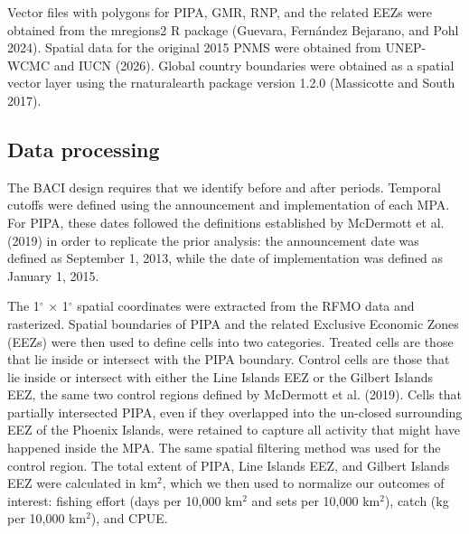 \documentclass[
  letterpaper,
  DIV=11,
  numbers=noendperiod]{scrartcl}
\begin{document}
Vector files with polygons for PIPA, GMR, RNP, and the related EEZs were
obtained from the mregions2 R package (Guevara, Fernández Bejarano, and
Pohl 2024). Spatial data for the original 2015 PNMS were obtained from
UNEP-WCMC and IUCN (2026). Global country boundaries were obtained as a
spatial vector layer using the rnaturalearth package version 1.2.0
(Massicotte and South 2017).

\subsection{Data processing}\label{data-processing}

The BACI design requires that we identify before and after periods.
Temporal cutoffs were defined using the announcement and implementation
of each MPA. For PIPA, these dates followed the definitions established
by McDermott et al. (2019) in order to replicate the prior analysis: the
announcement date was defined as September 1, 2013, while the date of
implementation was defined as January 1, 2015.

The 1\(^\circ\) × 1\(^\circ\) spatial coordinates were extracted from
the RFMO data and rasterized. Spatial boundaries of PIPA and the related
Exclusive Economic Zones (EEZs) were then used to define cells into two
categories. Treated cells are those that lie inside or intersect with
the PIPA boundary. Control cells are those that lie inside or intersect
with either the Line Islands EEZ or the Gilbert Islands EEZ, the same
two control regions defined by McDermott et al. (2019). Cells that
partially intersected PIPA, even if they overlapped into the un-closed
surrounding EEZ of the Phoenix Islands, were retained to capture all
activity that might have happened inside the MPA. The same spatial
filtering method was used for the control region. The total extent of
PIPA, Line Islands EEZ, and Gilbert Islands EEZ were calculated in
km\(^2\), which we then used to normalize our outcomes of interest:
fishing effort (days per 10,000 km\(^2\) and sets per 10,000 km\(^2\)),
catch (kg per 10,000 km\(^2\)), and CPUE.
\end{document}
